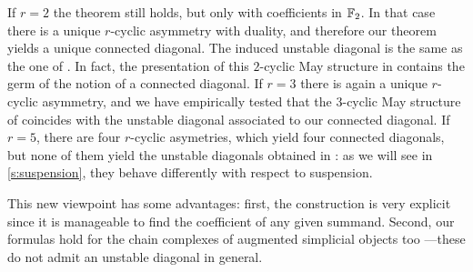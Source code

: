 If $r=2$ the theorem still holds, but only with coefficients in $\mathbb{F}_2$.
In that case there is a unique $r$-cyclic asymmetry with duality, and therefore our theorem yields a unique connected diagonal.
The induced unstable diagonal is the same as the one of \cite{medina2021may_st}.
In fact, the presentation of this $2$-cyclic May structure in \cite{medina2021fast_sq} contains the germ of the notion of a connected diagonal.
If $r=3$ there is again a unique $r$-cyclic asymmetry, and we have empirically tested that the $3$-cyclic May structure of \cite{medina2021may_st} coincides with the unstable diagonal associated to our connected diagonal.
If $r= 5$, there are four $r$-cyclic asymetries, which yield four connected diagonals, but none of them yield the unstable diagonals obtained in \cite{medina2021may_st}: as we will see in \cref{s:suspension}, they behave differently with respect to suspension.

This new viewpoint has some advantages: first, the construction is very explicit since it is manageable to find the coefficient of any given summand.
Second, our formulas hold for the chain complexes of augmented simplicial objects too ---these do not admit an unstable diagonal in general.

